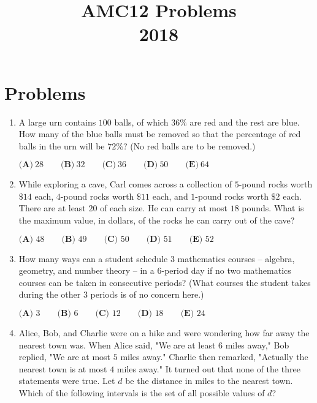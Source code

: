 \documentclass{article}
\title{AMC12 Problems \\ 2018}
\date{}
\begin{document}
\maketitle\thispagestyle{fancy}\newpage\section*{Problems}\begin{enumerate}[label=\arabic*., itemsep=0.5em]\item A large urn contains $100$ balls, of which $36 \%$ are red and the rest are blue. How many of the blue balls must be removed so that the percentage of red balls in the urn will be $72 \%$? (No red balls are to be removed.)

$ \textbf{(A)}\ 28 \qquad\textbf{(B)}\  32 \qquad\textbf{(C)}\  36 \qquad\textbf{(D)}\ 
 50 \qquad\textbf{(E)}\ 64 $\par \vspace{0.5em}\item While exploring a cave, Carl comes across a collection of $5$-pound rocks worth $\$14$ each, $4$-pound rocks worth $\$11$ each, and $1$-pound rocks worth $\$2$ each. There are at least $20$ of each size. He can carry at most $18$ pounds. What is the maximum value, in dollars, of the rocks he can carry out of the cave?

$\textbf{(A) } 48 \qquad \textbf{(B) } 49 \qquad \textbf{(C) } 50 \qquad \textbf{(D) } 51 \qquad \textbf{(E) } 52 $\par \vspace{0.5em}\item How many ways can a student schedule $3$ mathematics courses -- algebra, geometry, and number theory -- in a $6$-period day if no two mathematics courses can be taken in consecutive periods? (What courses the student takes during the other $3$ periods is of no concern here.)

$\textbf{(A) }3\qquad\textbf{(B) }6\qquad\textbf{(C) }12\qquad\textbf{(D) }18\qquad\textbf{(E) }24$\par \vspace{0.5em}\item Alice, Bob, and Charlie were on a hike and were wondering how far away the nearest town was. When Alice said, "We are at least $6$ miles away," Bob replied, "We are at most $5$ miles away." Charlie then remarked, "Actually the nearest town is at most $4$ miles away." It turned out that none of the three statements were true. Let $d$ be the distance in miles to the nearest town. Which of the following intervals is the set of all possible values of $d$?


\end{enumerate}
\end{document}

